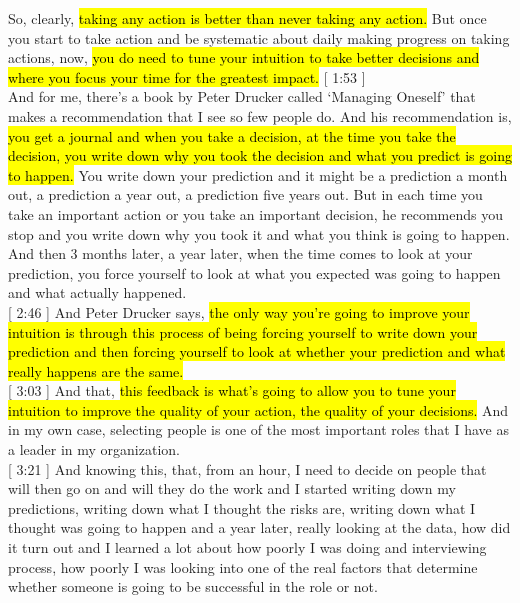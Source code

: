 \documentclass[a4paper,12pt]{article}
\begin{document}
So, clearly, \hl{taking any action is better than never taking any action.} But once you start to take action and be systematic about daily making progress on taking actions, now, \hl{you do need to tune your intuition to take better decisions and where you focus your time for the greatest impact.} [ 1:53 ] \\

And for me, there's a book by Peter Drucker called `Managing Oneself' that makes a recommendation that I see so few people do. And his recommendation is, \hl{you get a journal and when you take a decision, at the time you take the decision, you write down why you took the decision and what you predict is going to happen.} You write down your prediction and it might be a prediction a month out, a prediction a year out, a prediction five years out. But in each time you take an important action or you take an important decision, he recommends you stop and you write down why you took it and what you think is going to happen. And then 3 months later, a year later, when the time comes to look at your prediction, you force yourself to look at what you expected was going to happen and what actually happened. \\

[ 2:46 ] And Peter Drucker says, \hl{the only way you're going to improve your intuition is through this process of being forcing yourself to write down your prediction and then forcing yourself to look at whether your prediction and what really happens are the same.} \\

[ 3:03 ] And that, \hl{this feedback is what's going to allow you to tune your intuition to improve the quality of your action, the quality of your decisions.} And in my own case, selecting people is one of the most important roles that I have as a leader in my organization. \\

[ 3:21 ] And knowing this, that, from an hour, I need to decide on people that will then go on and will they do the work and I started writing down my predictions, writing down what I thought the risks are, writing down what I thought was going to happen and a year later, really looking at the data, how did it turn out and I learned a lot about how poorly I was doing and interviewing process, how poorly I was looking into one of the real factors that determine whether someone is going to be successful in the role or not. \\
\end{document}

